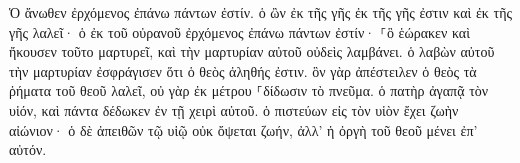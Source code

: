 \documentclass{openreader}
\begin{document}
Ὁ ἄνωθεν ἐρχόμενος ἐπάνω πάντων ἐστίν. ὁ ὢν ἐκ τῆς γῆς ἐκ τῆς γῆς ἐστιν καὶ ἐκ τῆς γῆς λαλεῖ· ὁ ἐκ τοῦ οὐρανοῦ ἐρχόμενος ἐπάνω πάντων ἐστίν· 
⸀ὃ ἑώρακεν καὶ ἤκουσεν τοῦτο μαρτυρεῖ, καὶ τὴν μαρτυρίαν αὐτοῦ οὐδεὶς λαμβάνει. 
ὁ λαβὼν αὐτοῦ τὴν μαρτυρίαν ἐσφράγισεν ὅτι ὁ θεὸς ἀληθής ἐστιν. 
ὃν γὰρ ἀπέστειλεν ὁ θεὸς τὰ ῥήματα τοῦ θεοῦ λαλεῖ, οὐ γὰρ ἐκ μέτρου ⸀δίδωσιν τὸ πνεῦμα. 
ὁ πατὴρ ἀγαπᾷ τὸν υἱόν, καὶ πάντα δέδωκεν ἐν τῇ χειρὶ αὐτοῦ. 
ὁ πιστεύων εἰς τὸν υἱὸν ἔχει ζωὴν αἰώνιον· ὁ δὲ ἀπειθῶν τῷ υἱῷ οὐκ ὄψεται ζωήν, ἀλλ’ ἡ ὀργὴ τοῦ θεοῦ μένει ἐπ’ αὐτόν. 
\end{document}
